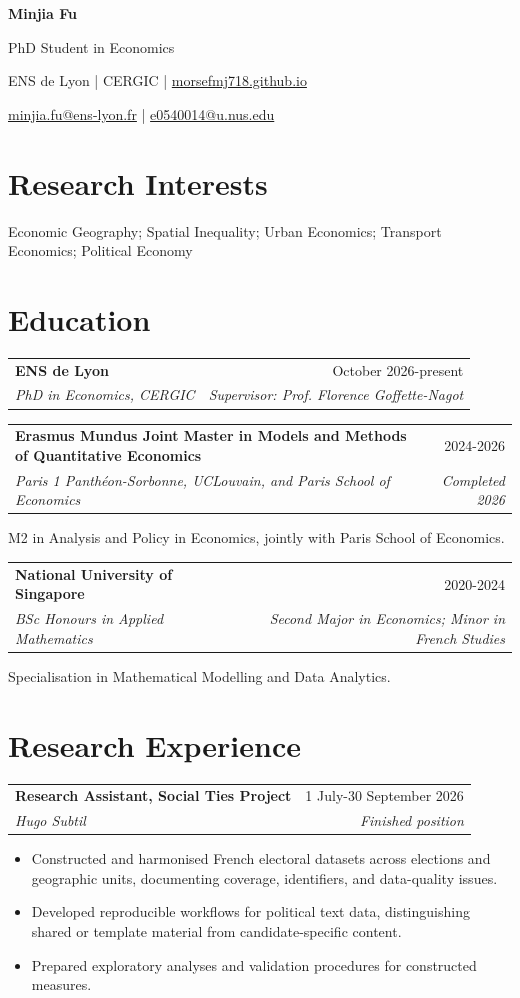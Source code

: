 \documentclass[11pt,letterpaper]{article}
\makeatletter
\newcommand{\entry}[4]{%
  \begin{tabularx}{\textwidth}{@{}Xr@{}}
    \textbf{#1} & \textcolor{muted}{#2} \\
    \textit{#3} & \textit{\textcolor{muted}{#4}}
  \end{tabularx}\vspace{2pt}
}
\makeatother
\begin{document}
{\Huge\bfseries Minjia Fu}\par
\vspace{4pt}
{\large PhD Student in Economics}\par
\vspace{4pt}
{\small ENS de Lyon \enspace | \enspace CERGIC \enspace | \enspace \href{https://morsefmj718.github.io}{morsefmj718.github.io}}\par
\vspace{2pt}
{\small \href{mailto:minjia.fu@ens-lyon.fr}{minjia.fu@ens-lyon.fr} \enspace | \enspace \href{mailto:e0540014@u.nus.edu}{e0540014@u.nus.edu}}

\section*{Research Interests}
Economic Geography; Spatial Inequality; Urban Economics; Transport Economics; Political Economy

\section*{Education}
\entry{ENS de Lyon}{October 2026-present}{PhD in Economics, CERGIC}{Supervisor: Prof. Florence Goffette-Nagot}

\entry{Erasmus Mundus Joint Master in Models and Methods of Quantitative Economics}{2024-2026}{Paris 1 Panthéon-Sorbonne, UCLouvain, and Paris School of Economics}{Completed 2026}
M2 in Analysis and Policy in Economics, jointly with Paris School of Economics.

\vspace{4pt}
\entry{National University of Singapore}{2020-2024}{BSc Honours in Applied Mathematics}{Second Major in Economics; Minor in French Studies}
Specialisation in Mathematical Modelling and Data Analytics.

\section*{Research Experience}
\entry{Research Assistant, Social Ties Project}{1 July-30 September 2026}{Hugo Subtil}{Finished position}
\begin{itemize}
  \item Constructed and harmonised French electoral datasets across elections and geographic units, documenting coverage, identifiers, and data-quality issues.
  \item Developed reproducible workflows for political text data, distinguishing shared or template material from candidate-specific content.
  \item Prepared exploratory analyses and validation procedures for constructed measures.
\end{itemize}
\end{document}
